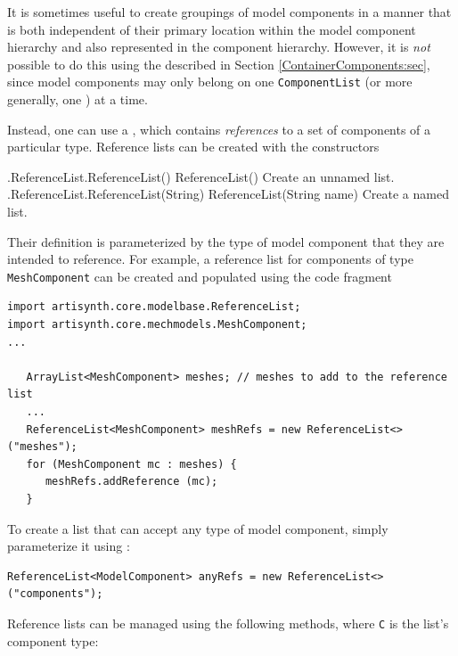 It is sometimes useful to create groupings of model components in a manner that
is both independent of their primary location within the model component
hierarchy and also represented in the component hierarchy.  However, it is {\it
not} possible to do this using the
described in Section \ref{ContainerComponents:sec}, since model components may
only belong on one {\tt ComponentList} (or more generally,
one ) at a time.

Instead, one can use a
, which contains
{\it references} to a set of components of a particular type.  Reference lists
can be created with the constructors
%
\begin{methodtable}{0.5}{0.5}
\midline
%
\methodentry
{\mbase.ReferenceList.ReferenceList()}%
{ReferenceList()}%
{Create an unnamed list.}%
%
\methodentry
{\mbase.ReferenceList.ReferenceList(String)}%
{ReferenceList(String name)}%
{Create a named list.}%
%
\midline
\end{methodtable}
%
Their definition is parameterized by the type of model component that they are
intended to reference. For example, a reference list for components of type
{\tt MeshComponent} can be created and populated using the code fragment
%
\begin{lstlisting}[]
import artisynth.core.modelbase.ReferenceList;
import artisynth.core.mechmodels.MeshComponent;
...

   ArrayList<MeshComponent> meshes; // meshes to add to the reference list
   ...
   ReferenceList<MeshComponent> meshRefs = new ReferenceList<> ("meshes");
   for (MeshComponent mc : meshes) {
      meshRefs.addReference (mc);
   }
\end{lstlisting}
%
To create a list that can accept any type of model component, simply
parameterize it using 
:
%
\begin{lstlisting}[]
   ReferenceList<ModelComponent> anyRefs = new ReferenceList<> ("components");
\end{lstlisting}
%
Reference lists can be managed using the following methods, where {\tt C} is
the list's component type:
%
